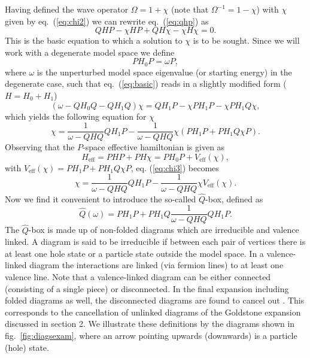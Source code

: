 Having defined the wave operator $\Omega = 1 +\chi$ (note that $
\Omega^{-1}=1-\chi$) with
$\chi$ given by eq.\ (\ref{eq:chi2}) we can rewrite
eq.\ (\ref{eq:qhp}) as
\begin{equation}
     QHP-\chi HP +QH\chi - \chi H\chi = 0. \label{eq:basic}
\end{equation}
This is the basic equation to which a solution to $\chi$ is
to be sought.
Since we will work with a degenerate model space we define
\[
   PH_0 P = \omega P,
\]
where $\omega$ is the unperturbed model space eigenvalue
(or starting energy) in the degenerate case,
such that eq.\ (\ref{eq:basic}) reads in a slightly modified form
($H=H_0 + H_1$)
\[
    (\omega -QH_0 Q -QH_1 Q)\chi = QH_1 P -\chi PH_1 P -\chi PH_1 Q\chi,
\]
which yields the following equation for $\chi$
\begin{equation}
    \chi = \frac{1}{\omega - QHQ}QH_1 P -\frac{1}{\omega -QHQ}\chi\left(PH_1 P +
    PH_1 Q\chi P\right).\label{eq:chi3}
\end{equation}
Observing that  the $P$-space effective hamiltonian is given as
\[
     H_{\mathrm{eff}}= PHP+PH\chi=PH_0 P + V_{\mathrm{eff}}(\chi),
\]
with $V_{\mathrm{eff}}(\chi)= PH_1 P + PH_1Q\chi P$, eq. (\ref{eq:chi3}) becomes
\begin{equation}
     \chi = \frac{1}{\omega - QHQ}QH_1 P -\frac{1}{\omega -QHQ}
     \chi V_{\mathrm{eff}}(\chi ).
     \label{eq:chi4}
\end{equation}
Now we find it convenient to introduce the so-called $\hat{Q}$-box,
defined as
\begin{equation}
     \hat{Q}(\omega)=PH_1 P + PH_1 Q\frac{1}{\omega - QHQ}
      QH_1 P.\label{eq:qbox}
\end{equation}
The $\hat{Q}$-box is made up of non-folded diagrams which are irreducible
and valence linked. A diagram is said to be irreducible if between each pair
of vertices there is at least one hole state or a particle state outside
the model space. In a valence-linked diagram the interactions are linked
(via fermion lines) to at least one valence line. Note that a valence-linked
diagram can be either connected (consisting of a single piece) or
disconnected. In the final expansion including folded diagrams as well, the
disconnected diagrams are found to cancel out \cite{ko90}. 
This corresponds to the cancellation of unlinked diagrams
of the Goldstone expansion discussed in section 2.
We illustrate
these definitions by the diagrams shown in fig.\ 
\ref{fig:diagsexam}, where an arrow pointing upwards
(downwards) is a particle (hole) state.
